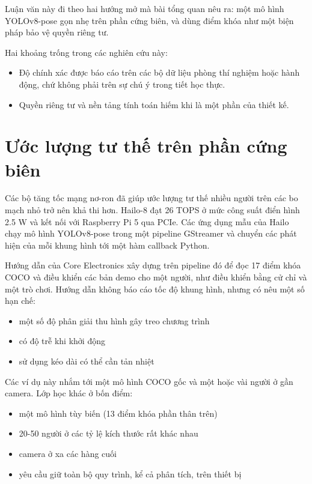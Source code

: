 Luận văn này đi theo hai hướng mở mà bài tổng quan nêu ra: một mô hình YOLOv8-pose gọn nhẹ trên phần cứng biên, và dùng điểm khóa như một biện pháp bảo vệ quyền riêng tư.

Hai khoảng trống trong các nghiên cứu này:

\begin{itemize}
\tightlist
\item
  Độ chính xác được báo cáo trên các bộ dữ liệu phòng thí nghiệm hoặc hành động, chứ không phải trên sự chú ý trong tiết học thực.
\item
  Quyền riêng tư và nền tảng tính toán hiếm khi là một phần của thiết kế.
\end{itemize}

\section{Ước lượng tư thế trên phần cứng biên}

Các bộ tăng tốc mạng nơ-ron đã giúp ước lượng tư thế nhiều người trên các bo mạch nhỏ trở nên khả thi hơn. Hailo-8 đạt 26 TOPS ở mức công suất điển hình 2.5 W \cite{b5} và kết nối với Raspberry Pi 5 qua PCIe. Các ứng dụng mẫu của Hailo chạy mô hình YOLOv8-pose trong một pipeline GStreamer và chuyển các phát hiện của mỗi khung hình tới một hàm callback Python.

Hướng dẫn của Core Electronics \cite{b6} xây dựng trên pipeline đó để đọc 17 điểm khóa COCO và điều khiển các bản demo cho một người, như điều khiển bằng cử chỉ và một trò chơi. Hướng dẫn không báo cáo tốc độ khung hình, nhưng có nêu một số hạn chế:

\begin{itemize}
\tightlist
\item
  một số độ phân giải thu hình gây treo chương trình
\item
  có độ trễ khi khởi động
\item
  sử dụng kéo dài có thể cần tản nhiệt
\end{itemize}

Các ví dụ này nhắm tới một mô hình COCO gốc và một hoặc vài người ở gần camera. Lớp học khác ở bốn điểm:

\begin{itemize}
\tightlist
\item
  một mô hình tùy biến (13 điểm khóa phần thân trên)
\item
  20-50 người ở các tỷ lệ kích thước rất khác nhau
\item
  camera ở xa các hàng cuối
\item
  yêu cầu giữ toàn bộ quy trình, kể cả phân tích, trên thiết bị
\end{itemize}

